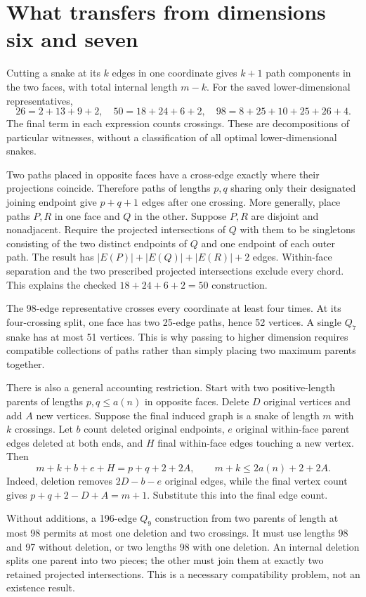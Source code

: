 \documentclass[11pt,a4paper]{article}
\begin{document}
\section{What transfers from dimensions six and seven}
Cutting a snake at its $k$ edges in one coordinate gives $k+1$ path
components in the two faces, with total internal length $m-k$.
For the saved lower-dimensional representatives,
\[
26=2+13+9+2,\quad
50=18+24+6+2,\quad
98=8+25+10+25+26+4.
\]
The final term in each expression counts crossings. These are
decompositions of particular witnesses, without a classification of
all optimal lower-dimensional snakes.

Two paths placed in opposite faces have a cross-edge exactly where
their projections coincide. Therefore paths of lengths $p,q$ sharing
only their designated joining endpoint give $p+q+1$ edges after one
crossing. More generally, place paths $P,R$ in one face and $Q$ in the
other. Suppose $P,R$ are disjoint and nonadjacent. Require the projected
intersections of $Q$ with them to be singletons consisting of the two
distinct endpoints of $Q$ and one endpoint of each outer path. The result has
$|E(P)|+|E(Q)|+|E(R)|+2$ edges. Within-face separation and the two
prescribed projected intersections exclude every chord.
This explains the checked $18+24+6+2=50$ construction.

The 98-edge representative crosses every coordinate at least four
times. At its four-crossing split, one face has two 25-edge paths,
hence 52 vertices. A single $Q_7$ snake has at most 51 vertices.
This is why passing to higher dimension requires compatible collections
of paths rather than simply placing two maximum parents together.

There is also a general accounting restriction. Start with two
positive-length parents of lengths $p,q\le a(n)$ in opposite faces.
Delete $D$ original vertices and add $A$ new vertices. Suppose the
final induced graph is a snake of length $m$ with $k$ crossings.
Let $b$ count deleted original endpoints, $e$ original within-face
parent edges deleted at both ends, and $H$ final within-face edges
touching a new vertex.
Then
\[
m+k+b+e+H=p+q+2+2A,\qquad
\boxed{m+k\le2a(n)+2+2A.}
\]
Indeed, deletion removes $2D-b-e$ original edges, while the final vertex
count gives $p+q+2-D+A=m+1$. Substitute this into the final edge count.

Without additions, a 196-edge $Q_9$ construction from two parents of
length at most 98 permits at most one deletion and two crossings.
It must use lengths 98 and 97 without deletion, or two lengths 98
with one deletion. An internal deletion splits one parent into two
pieces; the other must join them at exactly two retained projected
intersections. This is a necessary compatibility problem, not an
existence result.
\end{document}
